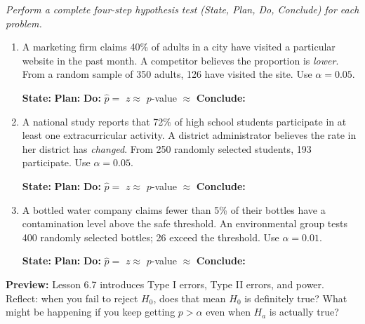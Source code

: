 \documentclass[10pt]{article}
\begin{document}
\namedateperiod

\vspace{0.15in}

\textit{Perform a complete four-step hypothesis test (State, Plan, Do, Conclude) for each problem.}

\begin{enumerate}

  \item A marketing firm claims 40\% of adults in a city have visited a particular
        website in the past month. A competitor believes the proportion is \emph{lower}.
        From a random sample of 350 adults, 126 have visited the site. Use $\alpha=0.05$.

        \textbf{State:} 
        \textbf{Plan:} 
        \textbf{Do:} $\hat p = $ \blank{2cm} \quad $z \approx$ \blank{2cm} \quad $p$-value $\approx$ \blank{2cm}
        \textbf{Conclude:} 

  \item A national study reports that 72\% of high school students participate in at
        least one extracurricular activity. A district administrator believes the rate
        in her district has \emph{changed}. From 250 randomly selected students, 193
        participate. Use $\alpha=0.05$.

        \textbf{State:} 
        \textbf{Plan:} 
        \textbf{Do:} $\hat p = $ \blank{2cm} \quad $z \approx$ \blank{2cm} \quad $p$-value $\approx$ \blank{2cm}
        \textbf{Conclude:} 

  \item A bottled water company claims fewer than 5\% of their bottles have a
        contamination level above the safe threshold. An environmental group tests 400
        randomly selected bottles; 26 exceed the threshold. Use $\alpha=0.01$.

        \textbf{State:} 
        \textbf{Plan:} 
        \textbf{Do:} $\hat p = $ \blank{2cm} \quad $z \approx$ \blank{2cm} \quad $p$-value $\approx$ \blank{2cm}
        \textbf{Conclude:} 

\end{enumerate}

\begin{reflectionbox}
\textbf{Preview:} Lesson 6.7 introduces Type I errors, Type II errors, and power. Reflect:
when you fail to reject $H_0$, does that mean $H_0$ is definitely true? What might be
happening if you keep getting $p > \alpha$ even when $H_a$ is actually true?
\end{reflectionbox}
\end{document}
